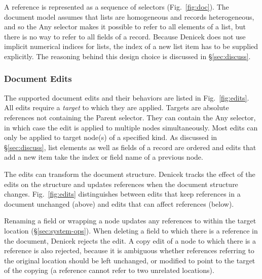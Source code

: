 \documentclass[sigconf,anonymous,screen]{acmart}
\newcommand{\ident}[1]{{\sffamily #1}}
\newcommand{\note}[1]{\textcolor{red}{#1}}
\begin{document}
A reference is represented as a sequence of selectors (Fig.~\ref{fig:doc}).
The document model assumes that lists are homogeneous and records heterogeneous, and so the
\ident{Any} selector makes it possible to refer to all elements of a list, but there is no
way to refer to all fields of a record. Because Denicek does not use implicit numerical
indices for lists, the index of a new list item has to be supplied explicitly. The reasoning behind
this design choice is discussed in \S\ref{sec:discuss}.

\subsubsection*{Document Edits}
The supported document edits and their behaviors are listed in Fig.~\ref{fig:edits}. All edits
require a \emph{target} to which they are applied. Targets are absolute references not containing the
\ident{Parent} selector. They can contain the \ident{Any} selector, in which case the edit is applied
to multiple nodes simultaneously. Most edits can only be applied to target node(s) of a specified
kind. As discussed in \S\ref{sec:discuss}, list elements as well as fields of a record are ordered
and edits that add a new item take the index or field name of a previous node.

The edits can transform the document structure. Denicek tracks the effect of the edits on the
structure and updates references when the document structure changes.
Fig.~\ref{fig:edits} distinguishes between edits that keep references in a document unchanged
(above) and edits that can affect references (below).

Renaming a field or wrapping a node updates any references to within the target location
(\S\ref{sec:system-ops}). When deleting a field to which there is a reference in the document, Denicek
rejects the edit. A copy edit of a node to which there is a reference is also rejected, because it
is ambiguous whether references referring to the original location should be left unchanged,
or modified to point to the target of the copying (a reference cannot refer to two unrelated locations).



\end{document}
